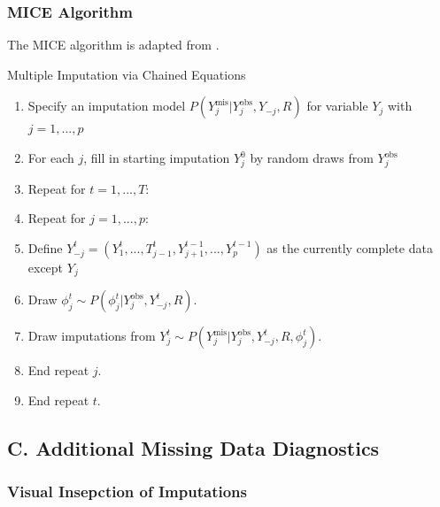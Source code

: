 \documentclass[12pt,]{article}
\newcommand{\appendixC}{ \setcounter{table}{0} \renewcommand{\thetable}{C\arabic{table}} \setcounter{figure}{0} \renewcommand{\thefigure}{C\arabic{figure}} }
\begin{document}
\subsubsection{MICE Algorithm}\label{mice-algorithm}

The MICE algorithm is adapted from \autocite{van_buuren_flexible_2012}.

\begin{algorithm}[H]
\label{alg:mice-alg}
\caption{Multiple Imputation via Chained Equations}
\DontPrintSemicolon
\SetAlgoLined
\BlankLine

\begin{enumerate}
  \item Specify an imputation model $P(Y^{\text{mis}}_j \vert Y^{\text{obs}}_j, Y_{-j}, R)$ for variable $Y_j$ with $j=1,...,p$
  \item For each $j$, fill in starting imputation $Y^0_j$ by random draws from $Y^{\text{obs}}_j$
  \item Repeat for $t=1,...,T:$
  \item Repeat for $j=1,...,p:$
  \item Define $Y^t_{-j} = (Y^t_1,...,T^t_{j-1}, Y^{t-1}_{j+1},..., Y^{t-1}_p)$ as the currently complete data except $Y_j$ 
  \item Draw $\phi^t_j \sim P(\phi^t_j \vert Y^{\text{obs}}_j, Y^t_{-j}, R)$.
  \item Draw imputations from $Y^t_j \sim P(Y^{ \text{mis} }_j \vert Y^{ \text{obs} }_j, Y^t_{-j}, R, \phi^t_j)$.
  \item End repeat $j$.
  \item End repeat $t$.

\end{enumerate}
\BlankLine

\end{algorithm}

\subsection*{C. Additional Missing Data
Diagnostics}\label{c.-additional-missing-data-diagnostics}

\appendixC

\subsubsection{Visual Insepction of
Imputations}\label{visual-insepction-of-imputations}
\end{document}
